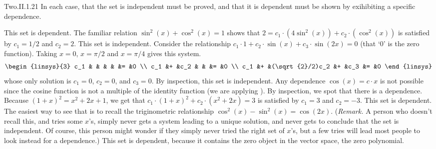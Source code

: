 \begin{ans}{Two.II.1.21}
      In each case, that the set is independent must be proved, and that it is
      dependent must be shown by exihibiting a specific dependence.
      \begin{exparts}
        \partsitem This set is dependent.
          The familiar relation $\sin^2(x)+\cos^2(x)=1$ shows that
          $2=c_1\cdot(4\sin^2(x))+c_2\cdot(\cos^2(x))$ is satisfied by
          $c_1=1/2$ and $c_2=2$.
        \partsitem This set is independent.
          Consider the relationship
          $c_1\cdot 1+c_2\cdot\sin(x)+c_3\cdot\sin(2x)=0$
          (that `$0$' is the zero function).
          Taking $x=0$, $x=\pi/2$ and $x=\pi/4$ gives this system.
          \begin{equation*}
            \begin{linsys}{3}
               c_1  &   &                &   &      &=  &0  \\
               c_1  &+  &c_2             &   &      &=  &0  \\
               c_1  &+  &(\sqrt{2}/2)c_2 &+  &c_3   &=  &0
            \end{linsys}
          \end{equation*}
          whose only solution is
          $c_1=0$, $c_2=0$, and $c_3=0$.
        \partsitem By inspection, this set is independent.
          Any dependence $\cos(x)=c\cdot x$ is not possible since the cosine
          function is not a multiple of the identity function
          (we are applying ).
        \partsitem By inspection, we spot that there is a dependence.
          Because $(1+x)^2=x^2+2x+1$, we get that
          $c_1\cdot(1+x)^2+c_2\cdot(x^2+2x)=3$ is satisfied by
          $c_1=3$ and $c_2=-3$.
        \partsitem This set is dependent.
          The easiest way to see that is to recall the triginometric
          relationship $\cos^2(x)-\sin^2(x)=\cos(2x)$.
          (\textit{Remark.}
          A person who doesn't recall this, and tries some $x$'s,
          simply never gets a system leading to a unique solution, and
          never gets to conclude that the set is independent.
          Of course, this person might wonder if they simply never tried the
          right set of $x$'s, but a few tries will lead most people to
          look instead for a dependence.)
        \partsitem This set is dependent, because it contains the
          zero object in the vector space, the zero polynomial.
      \end{exparts}
     
\end{ans}
